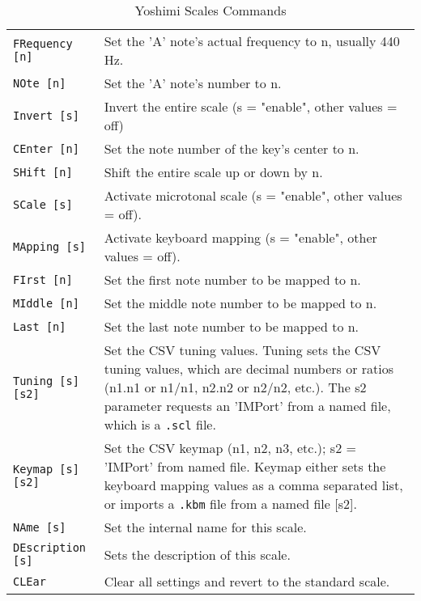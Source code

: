 \begin{center}
\begin{longtable}{p{4cm} p{10cm}}
\caption[Yoshimi Scales Commands]{Yoshimi Scales Commands} \\

\texttt{FRequency [n]} &
   Set the 'A' note's actual frequency to n, usually 440 Hz. \\
\texttt{NOte [n]} &
   Set the 'A' note's number to n. \\
\texttt{Invert [s]} &
   Invert the entire scale (s = "enable", other values = off) \\
\texttt{CEnter [n]} &
   Set the note number of the key's center to n. \\
\texttt{SHift [n]} &
   Shift the entire scale up or down by n. \\
\texttt{SCale [s]} &
   Activate microtonal scale (s = "enable", other values = off). \\
\texttt{MApping [s]} &
   Activate keyboard mapping (s = "enable", other values = off). \\
\texttt{FIrst [n]} &
   Set the first note number to be mapped to n. \\
\texttt{MIddle [n]} &
   Set the middle note number to be mapped to n. \\
\texttt{Last [n]} &
   Set the last note number to be mapped to n. \\
\texttt{Tuning [s] [s2]} &
   Set the CSV tuning values.
   Tuning sets the CSV tuning values, which are decimal numbers or ratios
   (n1.n1 or n1/n1, n2.n2 or n2/n2, etc.).
   The s2 parameter requests an 'IMPort' from a named file, which is
   \index{.scl}
   \index{config!.scl}
   a \texttt{.scl} file. \\
\texttt{Keymap [s] [s2]} &
   Set the CSV keymap (n1, n2, n3, etc.); s2 = 'IMPort' from named file.
   Keymap either sets the keyboard mapping values as a comma separated list, or
   imports a
   \index{.kbm}
   \index{config!.kbm}
   \texttt{.kbm} file from a named file [s2]. \\
\texttt{NAme [s]} &
   Set the internal name for this scale. \\
\texttt{DEscription [s]} &
   Sets the description of this scale. \\
\texttt{CLEar} &
   Clear all settings and revert to the standard scale. \\
\end{longtable}
\end{center}


